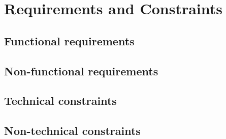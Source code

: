 \section{Requirements and Constraints}
\label{sec:req-const}

\subsection{Functional requirements}
\label{sec:funct-requ}

\subsection{Non-functional requirements}
\label{sec:non-funct-requ}

\subsection{Technical constraints}
\label{sec:techn-constr}

\subsection{Non-technical constraints}
\label{sec:non-techn-constr}


